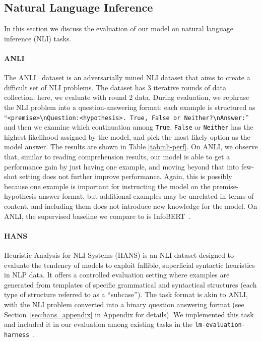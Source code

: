 \documentclass[11pt]{article}
\begin{document}
\subsection{Natural Language Inference}

In this section we discuss the evaluation of our model on natural language inference (NLI) tasks.

\paragraph{ANLI} The ANLI~\citep{Nie2020AdversarialNA} dataset is an adversarially mined NLI dataset that aims to create a difficult set of NLI problems. The dataset has 3 iterative rounds of data collection; here, we evaluate with round 2 data. During evaluation, we rephrase the NLI problem into a question-answering format: each example is structured as ``\texttt{<premise>\textbackslash nQuestion:<hypothesis>. True, False or Neither?\textbackslash nAnswer:}'' and then we examine which continuation among \texttt{True}, \texttt{False} or \texttt{Neither} has the highest likelihood assigned by the model, and pick the most likely option as the model answer. The results are shown in Table \ref{tab:nli-perf}. On ANLI, we observe that, similar to reading comprehension results, our model is able to get a performance gain by just having one example, and moving beyond that into few-shot setting does not further improve performance. Again, this is possibly because one example is important for instructing the model on the premise-hypothesis-answer format, but additional examples may be unrelated in terms of content, and including them does not introduce new knowledge for the model. On ANLI, the supervised baseline we compare to is InfoBERT~\cite{Wang2021InfoBERTIR}.

\paragraph{HANS} Heuristic Analysis for NLI Systems (HANS) \cite{hans} is an NLI dataset designed to evaluate the tendency of models to exploit fallible, superficial syntactic heuristics in NLP data. It offers a controlled evaluation setting where examples are generated from templates of specific grammatical and syntactical structures (each type of structure referred to as a ``subcase''). The task format is akin to ANLI, with the NLI problem converted into a binary question answering format (see Section~\ref{sec:hans_appendix} in Appendix for details). We implemented this task and included it in our evaluation among existing tasks in the \texttt{lm-evaluation-harness}~\citep{eval-harness}. 
\end{document}

